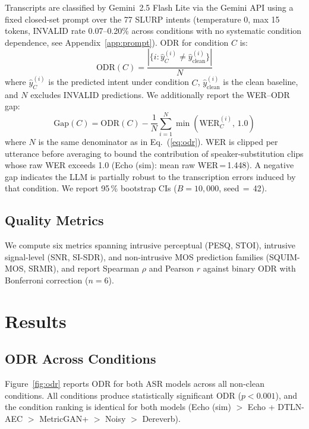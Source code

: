 \documentclass[11pt]{article}
\begin{document}
Transcripts are classified by Gemini~2.5 Flash Lite via the Gemini
API using a fixed closed-set prompt over the 77 SLURP intents
(temperature 0, max 15 tokens, INVALID rate 0.07--0.20\% across
conditions with no systematic condition dependence, see Appendix~\ref{app:prompt}).
ODR for condition $C$ is:
\begin{equation}
\text{ODR}(C) = \frac{|\{i : \hat{y}_C^{(i)} \neq
\hat{y}_{\text{clean}}^{(i)}\}|}{N}
\label{eq:odr}
\end{equation}
where $\hat{y}_C^{(i)}$ is the predicted intent under condition $C$,
$\hat{y}_{\text{clean}}^{(i)}$ is the clean baseline, and $N$
excludes INVALID predictions.
We additionally report the WER--ODR gap:
\begin{equation}
\text{Gap}(C) = \text{ODR}(C) - \frac{1}{N}\sum_{i=1}^{N}\min(\text{WER}_C^{(i)},\,1.0)
\label{eq:gap}
\end{equation}
where $N$ is the same denominator as in Eq.~(\ref{eq:odr}).
WER is clipped per utterance before averaging to bound the
contribution of speaker-substitution clips whose raw WER
exceeds 1.0 (Echo (sim): mean raw WER\,=\,1.448).
A negative gap indicates the LLM is partially robust to the
transcription errors induced by that condition.
We report 95\,\% bootstrap CIs ($B\!=\!10{,}000$, seed$\,=\,$42).
 
\subsection{Quality Metrics}
 
We compute six metrics spanning intrusive perceptual (PESQ, STOI),
intrusive signal-level (SNR, SI-SDR), and non-intrusive MOS
prediction families (SQUIM-MOS, SRMR), and report Spearman $\rho$
and Pearson $r$ against binary ODR with Bonferroni correction
($n\!=\!6$).
 
\section{Results}
\label{sec:results}
 
\subsection{ODR Across Conditions}
 
Figure~\ref{fig:odr} reports ODR for both
ASR models across all non-clean conditions.
All conditions produce statistically significant ODR ($p\!<\!0.001$),
and the condition ranking is identical for both models
(Echo (sim) $>$ Echo + DTLN-AEC $>$ MetricGAN{+} $>$ Noisy $>$ Dereverb).
\end{document}
